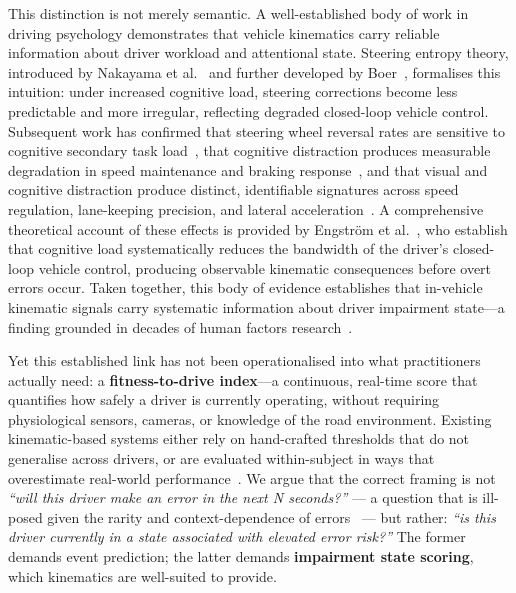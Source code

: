 This distinction is not merely semantic.
A well-established body of work in driving psychology demonstrates that
vehicle kinematics carry reliable information about driver workload and attentional state.
Steering entropy theory, introduced by Nakayama et al.~\cite{Nakayama1999} and
further developed by Boer~\cite{Boer2000}, formalises this intuition: under increased
cognitive load, steering corrections become less predictable and more irregular,
reflecting degraded closed-loop vehicle control.
Subsequent work has confirmed that steering wheel reversal rates are sensitive to
cognitive secondary task load~\cite{Kountouriotis2016},
that cognitive distraction produces measurable degradation in speed maintenance and
braking response~\cite{Strayer2003, Strayer2006},
and that visual and cognitive distraction produce distinct, identifiable signatures
across speed regulation, lane-keeping precision, and lateral acceleration~\cite{Engstrom2005}.
A comprehensive theoretical account of these effects is provided by
Engstr\"{o}m et al.~\cite{Engstrom2017}, who establish that cognitive load
systematically reduces the bandwidth of the driver's closed-loop vehicle control,
producing observable kinematic consequences before overt errors occur.
Taken together, this body of evidence establishes that in-vehicle kinematic signals
carry systematic information about driver impairment state---a finding grounded in
decades of human factors research~\cite{Nakayama1999, Boer2000, Engstrom2017}.

Yet this established link has not been operationalised into what practitioners actually
need: a \textbf{fitness-to-drive index}---a continuous, real-time score that quantifies
how safely a driver is currently operating, without requiring physiological sensors,
cameras, or knowledge of the road environment.
Existing kinematic-based systems either rely on hand-crafted thresholds
that do not generalise across drivers, or are evaluated within-subject in ways that
overestimate real-world performance~\cite{Kaplan2015}.
We argue that the correct framing is not \textit{``will this driver make an error
in the next N seconds?''} --- a question that is ill-posed given the rarity and
context-dependence of errors~\cite{Dingus2016} --- but rather:
\textit{``is this driver currently in a state associated with elevated error risk?''}
The former demands event prediction; the latter demands \textbf{impairment state scoring},
which kinematics are well-suited to provide.

